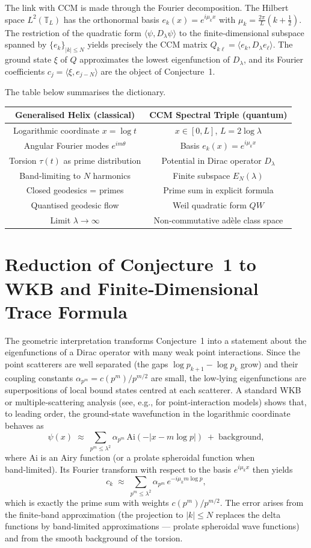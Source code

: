 \documentclass[12pt,a4paper]{article}
\newcommand{\T}{\mathbb{T}}
\begin{document}
The link with CCM is made through the Fourier decomposition.  The Hilbert space $L^2(\T_L)$ has the orthonormal basis $e_k(x)=e^{i\mu_k x}$ with $\mu_k = \frac{2\pi}{L}(k+\frac12)$.  The restriction of the quadratic form $\langle \psi, D_\lambda\psi\rangle$ to the finite‑dimensional subspace spanned by $\{e_k\}_{|k|\le N}$ yields precisely the CCM matrix $Q_{k\ell} = \langle e_k, D_\lambda e_\ell\rangle$.  The ground state $\xi$ of $Q$ approximates the lowest eigenfunction of $D_\lambda$, and its Fourier coefficients $c_j = \langle \xi, e_{j-N}\rangle$ are the object of Conjecture~1.

The table below summarises the dictionary.

\begin{center}
\begin{tabular}{c|c}
\textbf{Generalised Helix (classical)} & \textbf{CCM Spectral Triple (quantum)} \\
\hline
Logarithmic coordinate $x=\log t$ & $x\in[0,L]$, $L=2\log\lambda$ \\
Angular Fourier modes $e^{im\theta}$ & Basis $e_k(x)=e^{i\mu_k x}$ \\
Torsion $\tau(t)$ as prime distribution & Potential in Dirac operator $D_\lambda$ \\
Band‑limiting to $N$ harmonics & Finite subspace $E_N(\lambda)$ \\
Closed geodesics = primes & Prime sum in explicit formula \\
Quantised geodesic flow & Weil quadratic form $QW$ \\
Limit $\lambda\to\infty$ & Non‑commutative adèle class space
\end{tabular}
\end{center}

\section{Reduction of Conjecture~1 to WKB and Finite‑Dimensional Trace Formula}
The geometric interpretation transforms Conjecture~1 into a statement about the eigenfunctions of a Dirac operator with many weak point interactions.  Since the point scatterers are well separated (the gaps $\log p_{k+1}-\log p_k$ grow) and their coupling constants $\alpha_{p^m} = c(p^m)/p^{m/2}$ are small, the low‑lying eigenfunctions are superpositions of local bound states centred at each scatterer.  A standard WKB or multiple‑scattering analysis (see, e.g., \cite{Albeverio1988} for point‑interaction models) shows that, to leading order, the ground‑state wavefunction in the logarithmic coordinate behaves as
\[
\psi(x) \;\approx\; \sum_{p^m\le\lambda^2} \alpha_{p^m}\, \text{Ai}(-|x - m\log p|) \;+\; \text{background},
\]
where $\text{Ai}$ is an Airy function (or a prolate spheroidal function when band‑limited).  Its Fourier transform with respect to the basis $e^{i\mu_k x}$ then yields
\[
c_k \;\approx\; \sum_{p^m\le\lambda^2} \alpha_{p^m}\, e^{-i\mu_k m\log p},
\]
which is exactly the prime sum with weights $c(p^m)/p^{m/2}$.  The error arises from the finite‑band approximation (the projection to $|k|\le N$ replaces the delta functions by band‑limited approximations — prolate spheroidal wave functions) and from the smooth background of the torsion.
\end{document}
